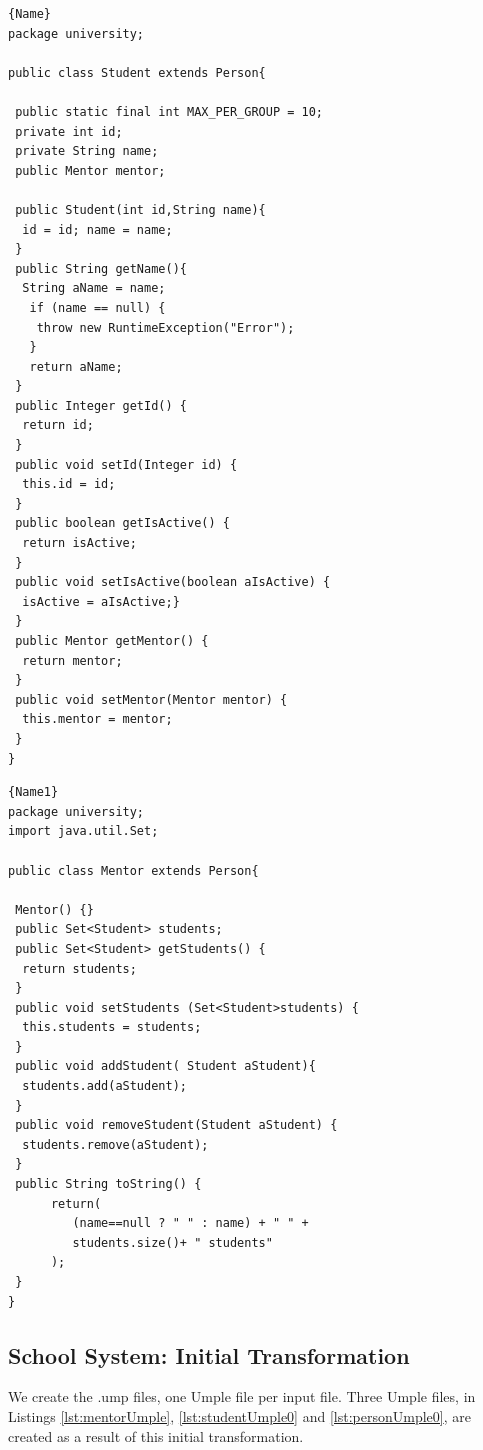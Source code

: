 \noindent\begin{minipage}{.45\textwidth}
\begin{lstlisting}[style=java,caption=Student.java,label=lst:StudentJava]{Name}
package university;

public class Student extends Person{ 

 public static final int MAX_PER_GROUP = 10; 
 private int id; 
 private String name;
 public Mentor mentor; 

 public Student(int id,String name){ 
  id = id; name = name; 
 } 
 public String getName(){
  String aName = name;
   if (name == null) { 
    throw new RuntimeException("Error");
   } 
   return aName; 
 }
 public Integer getId() {
  return id;
 }
 public void setId(Integer id) { 
  this.id = id; 
 } 
 public boolean getIsActive() { 
  return isActive;
 }
 public void setIsActive(boolean aIsActive) {
  isActive = aIsActive;} 
 }   
 public Mentor getMentor() { 
  return mentor; 
 }
 public void setMentor(Mentor mentor) { 
  this.mentor = mentor; 
 } 
}
\end{lstlisting}
\end{minipage}\hfill
\begin{minipage}{.45\textwidth}
\begin{lstlisting}[style=java,caption=Mentor.java,label=lst:mentorJava]{Name1}
package university;
import java.util.Set;

public class Mentor extends Person{ 

 Mentor() {}
 public Set<Student> students;
 public Set<Student> getStudents() {
  return students; 
 } 
 public void setStudents (Set<Student>students) { 
  this.students = students;
 } 
 public void addStudent( Student aStudent){
  students.add(aStudent); 
 }
 public void removeStudent(Student aStudent) {
  students.remove(aStudent);
 } 
 public String toString() {
      return(
         (name==null ? " " : name) + " " +
         students.size()+ " students"
      );
 }
}
\end{lstlisting}
\end{minipage}

\subsection{School System: Initial Transformation}

We create the .ump files, one Umple file per input file. Three Umple files, in Listings \ref{lst:mentorUmple}, \ref{lst:studentUmple0} and  \ref{lst:personUmple0}, are created as a result of this initial transformation. 

